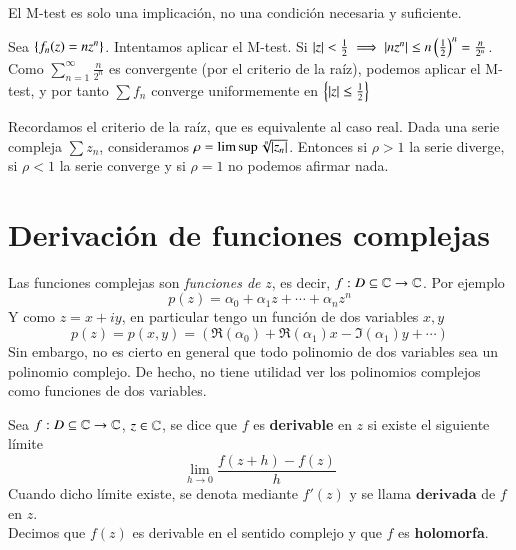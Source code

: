     \begin{obs}
        El M-test es solo una implicación, no una condición necesaria y suficiente.
    \end{obs}

    \begin{eg}
        Sea $\left\{f_n(z) = nz^n\right\}$. Intentamos aplicar el M-test. Si $\left|z\right| < \frac{1}{2} \implies \left|nz^n\right| \leq n \left(\frac{1}{2}\right)^n = \frac{n}{2^n}$. Como $\sum_{n=1}^{\infty} \frac{n}{2^n}$ es convergente (por el criterio de la raíz), podemos aplicar el M-test, y por tanto $\sum f_n$ converge uniformemente en $\left\{\left|z\right| \leq \frac{1}{2}\right\}$
    \end{eg}

    \begin{obs}
        Recordamos el criterio de la raíz, que es equivalente al caso real. Dada una serie compleja $\sum z_n$, consideramos $\rho = \limsup \sqrt[n]{\left|z_n\right|}$. Entonces si $\rho > 1$ la serie diverge, si $\rho < 1$ la serie converge y si $\rho = 1$ no podemos afirmar nada.
    \end{obs}

\section{Derivaci\'on de funciones complejas}
Las funciones complejas son \textit{funciones de} $z$, es decir, $f: D \subseteq \mathbb{C} \to \mathbb{C}$.
Por ejemplo
$$
    p(z) = \alpha_0 + \alpha_1 z + \cdots + \alpha_n z^n
$$
Y como $z = x + iy$, en particular tengo un función de dos variables $x, y$
$$
    p(z) = p(x, y) = (\Re(\alpha_0) + \Re(\alpha_1)x - \Im(\alpha_1)y + \cdots)
$$
Sin embargo, no es cierto en general que todo polinomio de dos variables sea un polinomio complejo. De hecho, no tiene utilidad ver los polinomios complejos como funciones de dos variables.

\begin{dfn}
    Sea $f: D\subseteq \mathbb{C} \to \mathbb{C}$, $z \in \mathbb{C}$, se dice que $f$ es \textbf{derivable} en $z$ si existe el siguiente límite
    $$
        \lim_{h\to 0} \frac{f(z+h) - f(z)}{h}
    $$
    Cuando dicho límite existe, se denota mediante $f'(z)$ y se llama $\textbf{derivada}$ de $f$ en $z$.\\
    Decimos que $f(z)$ es derivable en el sentido complejo y que $f$ es \textbf{holomorfa}.
\end{dfn}

